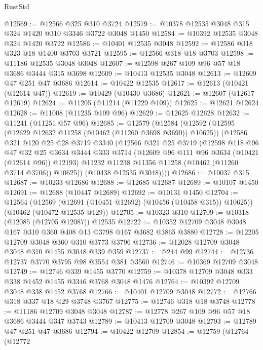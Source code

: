 \begin{lexlean}{RustStd}
\begin{coremodule}
@12569 := @12566 @325 @310 @3724
@12579 := @10378 @12535 @3048 @315 @324 @1420 @310 @3346 @3722 @3048 @1450
@12584 := @10392 @12535 @3048 @324 @1420 @3722
@12586 := @10401 @12535 @3048
@12592 := @12586 @318 @323 @18 @1400 @3703 @3721
@12595 := @12566 @318 @18 @3703
@12598 := @11186 @12535 @3048 @3048
@12607 := @12598 @267 @109 @96 @57 @18 @3686 @3444 @315 @3698
@12609 := @10413 @12535 @3048
@12613 := @12609 @47 @251 @47 @3686
@12614 := @10422 @12535
@12617 := @12613 (@10421 (@12614 @47))
@12619 := @10429 (@10430 @3686)
@12621 := @12607 (@12617 @12619)
@12624 := @11205 (@11214 (@11229 @109))
@12625 := @12621 @12624
@12628 := @11008 (@11235 @109 @96)
@12629 := @12625 @12628
@12632 := @11241 (@11251 @57 @96)
@12685 := @12579
    (@12584
      (@12592
        (@12595 (@12629 @12632 @11258 (@10462 (@11260 @3698 @3690)) @10625))
        (@12586
          @321
          @120
          @25
          @28
          @3719
          @3340
          (@12566
            @321
            @25
            @3719
            (@12598
              @118
              @96
              @47
              @32
              @25
              @3634
              @3444
              @333
              @3714
              (@12609 @96 @111 @96 @3634 (@10421 (@12614 @96)) @12193)
              @11232
              @11238
              @11356
              @11258
              (@10462 (@11260 @3714 @3706))
              @10625))
          (@10438 @12535 @3048))))
@12686 := @10037 @315
@12687 := @10233 @12686
@12688 := @12685 @12687
@12689 := @10107 @1450
@12691 := @12688 (@10447 @12689)
@12692 := @10131 @1450
@12704 := @12564
    (@12569 (@12691 (@10451 @12692) (@10456 (@10458 @315)) @10625))
    (@10462 (@10472 @12535 @129))
@12705 := @10323 @310
@12709 := @10318 (@12085 (@12705 @12087)) @12535
@12722 := @10352 @12709 @3048 @3048 @167 @310 @360 @408 @13 @3798 @167 @3682 @3865 @3880
@12728 := @12205 @12709 @3048 @360 @310 @3773 @3796
@12736 := @12028 @12709 @3048 @3048 @310 @1455 @3048 @339 @359
@12737 := @244 @99
@12744 := @12736 @12737 @3770 @3795 @98 @3554 @381 @3560
@12746 := @10369 @12709 @3048
@12749 := @12746 @339 @1455 @3770
@12759 := @10378 @12709 @3048 @333 @338 @1452 @1455 @3346 @3768 @3048 @1476
@12764 := @10392 @12709 @3048 @338 @1452 @3768
@12766 := @10401 @12709 @3048
@12772 := @12766 @318 @337 @18 @29 @3748 @3767
@12775 := @12746 @318 @18 @3748
@12778 := @11186 @12709 @3048 @3048
@12787 := @12778 @267 @109 @96 @57 @18 @3686 @3444 @347 @3743
@12789 := @10413 @12709 @3048
@12793 := @12789 @47 @251 @47 @3686
@12794 := @10422 @12709
@12854 := @12759
    (@12764
      (@12772

\end{coremodule}
\end{lexlean}
